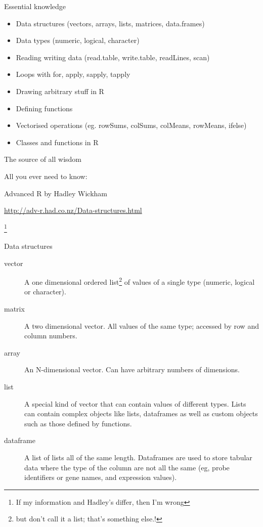 \documentclass[pdf]{beamer}
\newcommand\blfootnote[1]{%
  \begingroup  %
  \renewcommand\thefootnote{}\footnote{#1}%
  \addtocounter{footnote}{-1}  %
  \endgroup
}
\begin{document}
\begin{frame}{Essential knowledge}
  \begin{itemize}
  \item Data structures (vectors, arrays, lists, matrices, data.frames)
  \item Data types (numeric, logical, character)
  \item Reading writing data (read.table, write.table, readLines, scan)
  \item Loops with for, apply, sapply, tapply
  \item Drawing arbitrary stuff in R
  \item Defining functions
  \item Vectorised operations (eg. rowSums, colSums, colMeans, rowMeans, ifelse)
  \item Classes and functions in R
  \end{itemize}
\end{frame}

\begin{frame}{The source of all wisdom}
  
  \footnotesize All you ever need to know:

  Advanced R \small by Hadley Wickham

  \url{http://adv-r.had.co.nz/Data-structures.html}

\blfootnote{If my information and Hadley's differ, then I'm wrong}
\end{frame}

\begin{frame}{Data structures}

  {\small
  \begin{description}
    \item[vector] A one dimensional ordered list\footnote{but don't call it a
      list; that's something else.!} 
      of values of a single type (numeric, logical or character).
    \item[matrix] A two dimensional vector. All values of the same type; accessed
      by row and column numbers.
    \item[array] An N-dimensional vector. Can have arbitrary numbers of dimensions.
    \item[list] A special kind of vector that can contain values of different types.
      Lists can contain complex objects like
      lists, dataframes as well as custom objects such as those defined by functions.
    \item[dataframe] A list of lists all of the same length. Dataframes are used to store
      tabular data where the type of the column are not all the same (eg, probe identifiers
      or gene names, and expression values).
  \end{description}
}
\end{frame}
\end{document}
